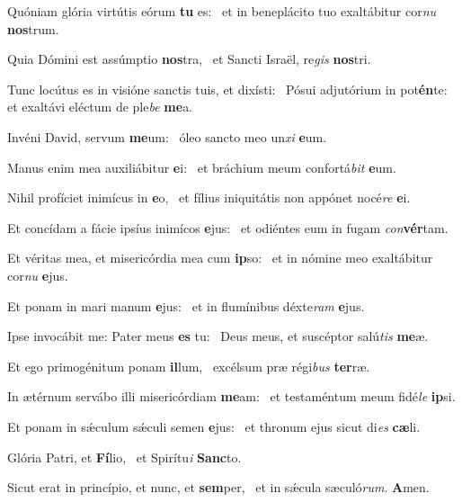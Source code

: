 \item Quóniam glória virtútis eórum \textbf{tu} es:~\psstar{} et in beneplácito tuo exaltábitur cor\textit{nu} \textbf{nos}trum.
\item Quia Dómini est assúmptio \textbf{nos}tra,~\psstar{} et Sancti Israël, re\textit{gis} \textbf{nos}tri.
\item Tunc locútus es in visióne sanctis tuis, et dixísti:~\pscross{} Pósui adjutórium in pot\textbf{én}te:~\psstar{} et exaltávi eléctum de ple\textit{be} \textbf{me}a.
\item Invéni David, servum \textbf{me}um:~\psstar{} óleo sancto meo un\textit{xi} \textbf{e}um.
\item Manus enim mea auxiliábitur \textbf{e}i:~\psstar{} et bráchium meum confortá\textit{bit} \textbf{e}um.
\item Nihil profíciet inimícus in \textbf{e}o,~\psstar{} et fílius iniquitátis non appónet nocé\textit{re} \textbf{e}i.
\item Et concídam a fácie ipsíus inimícos \textbf{e}jus:~\psstar{} et odiéntes eum in fugam \textit{con}\textbf{vér}tam.
\item Et véritas mea, et misericórdia mea cum \textbf{ip}so:~\psstar{} et in nómine meo exaltábitur cor\textit{nu} \textbf{e}jus.
\item Et ponam in mari manum \textbf{e}jus:~\psstar{} et in flumínibus déxte\textit{ram} \textbf{e}jus.
\item Ipse invocábit me: Pater meus \textbf{es} tu:~\psstar{} Deus meus, et suscéptor salú\textit{tis} \textbf{me}æ.
\item Et ego primogénitum ponam \textbf{il}lum,~\psstar{} excélsum præ régi\textit{bus} \textbf{ter}ræ.
\item In ætérnum servábo illi misericórdiam \textbf{me}am:~\psstar{} et testaméntum meum fidé\textit{le} \textbf{ip}si.
\item Et ponam in sǽculum sǽculi semen \textbf{e}jus:~\psstar{} et thronum ejus sicut di\textit{es} \textbf{cæ}li.
\item Glória Patri, et \textbf{Fí}lio,~\psstar{} et Spirítu\textit{i} \textbf{Sanc}to.
\item Sicut erat in princípio, et nunc, et \textbf{sem}per,~\psstar{} et in sǽcula sæculó\textit{rum}. \textbf{A}men.
